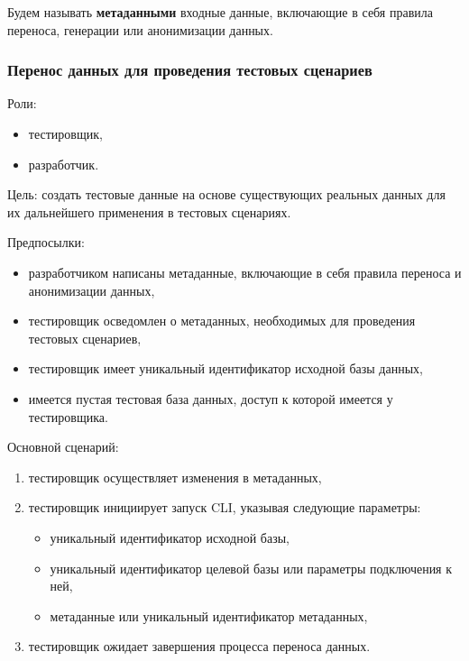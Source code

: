 Будем называть \textbf{метаданными} входные данные, включающие в себя правила переноса, генерации или анонимизации данных.

\subsubsection{Перенос данных для проведения тестовых сценариев}

Роли:

\begin{itemize}
    \item тестировщик,
    \item разработчик.
\end{itemize}

Цель: создать тестовые данные на основе существующих реальных данных для их дальнейшего применения в тестовых сценариях.

Предпосылки:

\begin{itemize}
    \item разработчиком написаны метаданные, включающие в себя правила переноса и анонимизации данных,
    \item тестировщик осведомлен о метаданных, необходимых для проведения тестовых сценариев,
    \item тестировщик имеет уникальный идентификатор исходной базы данных,
    \item имеется пустая тестовая база данных, доступ к которой имеется у тестировщика.
\end{itemize}

Основной сценарий:

\begin{enumerate}
    \item тестировщик осуществляет изменения в метаданных,
    \item тестировщик инициирует запуск CLI, указывая следующие параметры:
    \begin{itemize}
        \item уникальный идентификатор исходной базы,
        \item уникальный идентификатор целевой базы или параметры подключения к ней,
        \item метаданные или уникальный идентификатор метаданных,
    \end{itemize}
    \item тестировщик ожидает завершения процесса переноса данных.
\end{enumerate}

